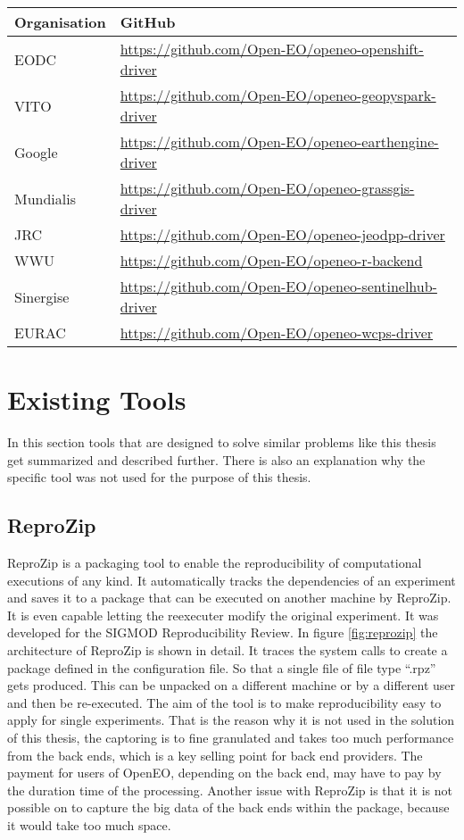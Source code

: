 \documentclass[draft,final]{vutinfth} %
\begin{document}
\begin{table}[]
	\begin{tabular}{l|l}
		\textbf{Organisation} & \textbf{GitHub}  \\ \hline
		EODC & \url{https://github.com/Open-EO/openeo-openshift-driver} \\ \hline 
		VITO & \url{https://github.com/Open-EO/openeo-geopyspark-driver} \\ \hline  
		Google  & \url{https://github.com/Open-EO/openeo-earthengine-driver} \\ \hline  
		Mundialis & \url{https://github.com/Open-EO/openeo-grassgis-driver} \\ \hline 
		JRC & \url{https://github.com/Open-EO/openeo-jeodpp-driver} \\ \hline
		WWU & \url{https://github.com/Open-EO/openeo-r-backend} \\ \hline
		Sinergise & \url{https://github.com/Open-EO/openeo-sentinelhub-driver} \\ \hline
		EURAC & \url{https://github.com/Open-EO/openeo-wcps-driver} \\ 
	\end{tabular}
\end{table}
\section{Existing Tools}\label{Existing Tools}
In this section tools that are designed to solve similar problems like this thesis get summarized and described further. There is also an explanation why the specific tool was not used for the purpose of this thesis. 

\subsection{ReproZip}\label{ReproZip}
ReproZip is a packaging tool to enable the reproducibility of computational executions of any kind. It automatically tracks the dependencies of an experiment and saves it to a package that can be executed on another machine by ReproZip. It is even capable letting the reexecuter modify the original experiment. It was developed for the SIGMOD Reproducibility Review. In figure \ref{fig:reprozip} the architecture of ReproZip is shown in detail. It traces the system calls to create a package defined in the configuration file. So that a single file of file type “.rpz” gets produced. This can be unpacked on a different machine or by a different user and then be re-executed. The aim of the tool is to make reproducibility easy to apply for single experiments. \cite{29c5846926a4497d95f276604cb0368c} That is the reason why it is not used in the solution of this thesis, the captoring  is to fine granulated and takes too much performance from the back ends, which is a key selling point for back end providers. The payment for users of OpenEO, depending on the back end, may have to pay by the duration time of the processing. Another issue with ReproZip is that it is not possible on to capture the big data of the back ends within the package, because it would take too much space.  
\end{document}
